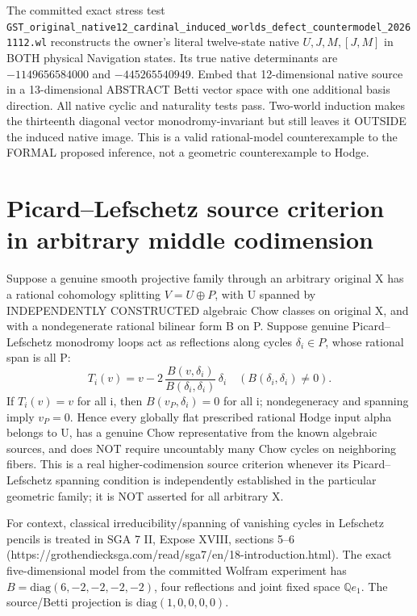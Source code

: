 \documentclass[11pt]{article}
\begin{document}
The committed exact stress test
\texttt{GST\_original\_native12\_cardinal\_induced\_worlds\_defect\_countermodel\_20261112.wl}
reconstructs the owner's literal twelve-state native
\(U,J,M,[J,M]\) in BOTH physical Navigation states.
Its true native determinants are
\(-1149656584000\) and \(-445265540949\).
Embed that 12-dimensional native source in a
13-dimensional ABSTRACT Betti vector space
with one additional basis direction. All
native cyclic and naturality tests pass.
Two-world induction makes the thirteenth
diagonal vector monodromy-invariant but
still leaves it OUTSIDE the induced native
image. This is a valid rational-model
counterexample to the FORMAL proposed inference,
not a geometric counterexample to Hodge.

\section{Picard--Lefschetz source criterion in arbitrary middle codimension}
Suppose a genuine smooth projective family through
an arbitrary original X has a rational cohomology
splitting \(V=U\oplus P\), with U spanned by
INDEPENDENTLY CONSTRUCTED algebraic Chow
classes on original X, and with a nondegenerate
rational bilinear form B on P.
Suppose genuine Picard--Lefschetz monodromy
loops act as reflections along cycles
\(\delta_i\in P\), whose rational span is all P:
\[
T_i(v)=v-2\,\frac{B(v,\delta_i)}
{B(\delta_i,\delta_i)}\,\delta_i
\quad (B(\delta_i,\delta_i)\ne0).
\]
If \(T_i(v)=v\) for all i, then
\(B(v_P,\delta_i)=0\) for all i; nondegeneracy
and spanning imply \(v_P=0\).
Hence every globally flat prescribed rational
Hodge input alpha belongs to U, has a
genuine Chow representative from the
known algebraic sources, and does NOT require
uncountably many Chow cycles on neighboring fibers.
This is a real higher-codimension source criterion
whenever its Picard--Lefschetz spanning condition
is independently established in the particular
geometric family; it is NOT asserted for all
arbitrary X.

For context, classical irreducibility/spanning
of vanishing cycles in Lefschetz pencils is
treated in SGA 7 II, Expose XVIII, sections
5--6 (https://grothendiecksga.com/read/sga7/en/18-introduction.html).
The exact five-dimensional model from the
committed Wolfram experiment has
\(B=\mathrm{diag}(6,-2,-2,-2,-2)\),
four reflections and joint fixed space
\(\mathbb Q e_1\). The source/Betti projection
is \(\mathrm{diag}(1,0,0,0,0)\).
\end{document}
